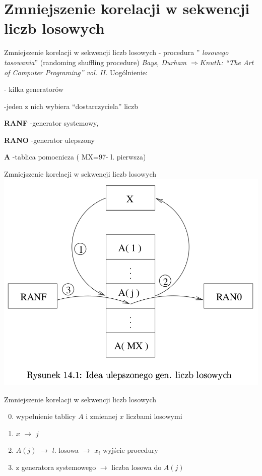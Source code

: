 \section{Zmniejszenie korelacji w sekwencji liczb losowych}
	\begin{frame}{Zmniejszenie korelacji w sekwencji liczb losowych}
	- procedura '' {\it losowego tasowania}'' (randoming shuffling procedure) {\it Bays, Durham 	$\Rightarrow Knuth$: ``The Art of Computer 	Programing'' vol. II.} 
	\newline \newline
	Uogólnienie:

	- kilka generatorów

	-jeden z nich wybiera ``dostarczyciela'' liczb

	\textbf{RANF} -generator systemowy,

	\textbf{RANO} -generator ulepszony

	\textbf{A} -tablica pomocnicza ( MX=97- l. pierwsza)

	\end{frame}
    
	\begin{frame}{Zmniejszenie korelacji w sekwencji liczb losowych}
		\centering \includegraphics[width=.8\linewidth]{img/14/14_5_1_img.png}
	\end{frame}

	\begin{frame}{Zmniejszenie korelacji w sekwencji liczb losowych}
		\begin{enumerate}
			\setcounter{enumi}{-1}
			\item wypełnienie tablicy $A$ i zmiennej $x$ liczbami losowymi
			\item $x$ $\rightarrow$ $j$
			\item $A(j)$ $\rightarrow$ $l$. losowa $\rightarrow$ $x_{i}$ wyjście procedury
			\item z generatora systemowego $\rightarrow$ liczba losowa do $A(j)$
		\end{enumerate}
	\end{frame}

